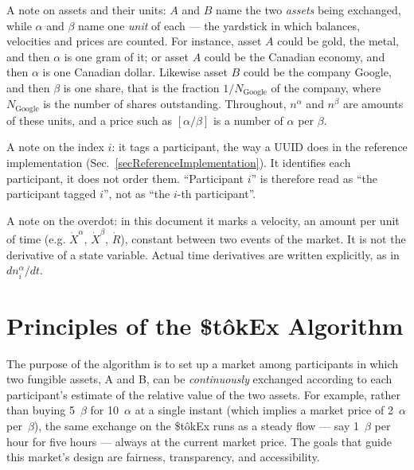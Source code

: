 \documentclass[letterpaper]{article}
\newcommand{\priceAB}{\left[\alpha / \beta\right]}
\newcommand{\StokEx}{\$t\^{o}kEx}
\begin{document}
A note on assets and their units: $A$ and $B$ name the two \emph{assets} being exchanged, while $\alpha$ and $\beta$ name one \emph{unit} of each --- the yardstick in which balances,
velocities and prices are counted. For instance, asset $A$ could be gold, the metal, and then $\alpha$ is one gram of it; or asset $A$ could be the Canadian economy, and then $\alpha$ is one Canadian dollar.
Likewise asset $B$ could be the company Google, and then $\beta$ is one share, that is the fraction $1/N_{\mathrm{Google}}$ of the company, where $N_{\mathrm{Google}}$ is the number of shares outstanding.
Throughout, $n^\alpha$ and $n^\beta$ are amounts of these units, and a price such as $\priceAB$ is a number of $\alpha$ per $\beta$.

A note on the index $i$: it tags a participant, the way a UUID does in the reference implementation (Sec.~\ref{secReferenceImplementation}).
It identifies each participant, it does not order them. ``Participant $i$'' is therefore read as ``the participant tagged $i$'', not as ``the $i$-th participant''.

A note on the overdot: in this document it marks a velocity, an amount per unit of time (e.g. $\dot{X}^\alpha$, $\dot{X}^\beta$, $\dot{R}$), constant between two events of the market.
It is not the derivative of a state variable. Actual time derivatives are written explicitly, as in $dn^\alpha_i/dt$.

\section{Principles of the \StokEx{} Algorithm} %

The purpose of the algorithm is to set up a market among participants in which two fungible assets,
A and B, can be \emph{continuously} exchanged according to each participant's estimate
of the relative value of the two assets. For example, rather than buying 5~$\beta$ for 10~$\alpha$ at a single instant
(which implies a market price of 2~$\alpha$ per~$\beta$),
the same exchange on the \StokEx{} runs as a steady flow --- say 1~$\beta$ per hour for five hours ---
always at the current market price.
The goals that guide this market's design are fairness, transparency, and accessibility.
\end{document}
